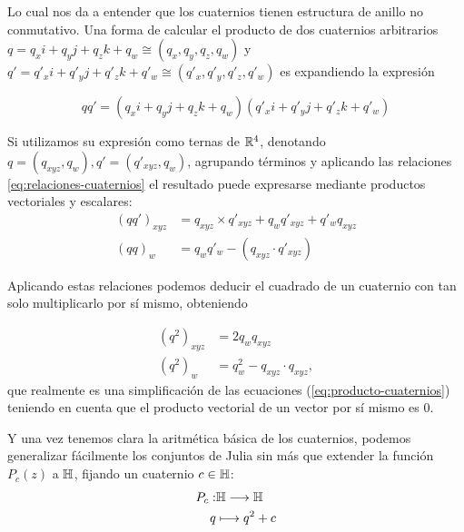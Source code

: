 Lo cual nos da a entender que los cuaternios tienen estructura de anillo no conmutativo. Una forma de calcular el producto de dos cuaternios arbitrarios $q = q_x i + q_y j + q_z k + q_w\cong (q_x,q_y,q_z,q_w)$ y $q' = q'_x i + q'_y j + q'_z  k + q'_w\cong (q'_x,q'_y,q'_z,q'_w)$ es expandiendo la expresión

\begin{equation}
    qq' = (q_x i + q_y j + q_z k + q_w)(q'_x i + q'_y j + q'_z k + q'_w) 
\end{equation}

Si utilizamos su expresión como ternas de $\mathbb{R}^4$, denotando $q=(q_{xyz},q_w), q'=(q'_{xyz},q_w)$, agrupando términos y aplicando las relaciones \ref{eq:relaciones-cuaternios} el resultado puede expresarse mediante productos vectoriales y escalares:
\begin{equation}
    \label{eq:producto-cuaternios}
    \begin{split}
        (qq')_{xyz} &= q_{xyz}\times q'_{xyz} + q_w q'_{xyz} + q'_wq_{xyz} \\
        (qq)_w &= q_wq'_w - (q_{xyz}\cdot q'_{xyz})
    \end{split}
\end{equation}

Aplicando estas relaciones podemos deducir el cuadrado de un cuaternio con tan solo multiplicarlo por sí mismo, obteniendo

\begin{equation}
    \label{eq:cuadrado-cuaternio}
    \begin{split}
        (q^2)_{xyz} &= 2q_w q_{xyz} \\
        (q^2)_w &= q_w^2 - q_{xyz}\cdot q_{xyz},
    \end{split}
\end{equation}
que realmente es una simplificación de las ecuaciones (\ref{eq:producto-cuaternios}) teniendo en cuenta que el producto vectorial de un vector por sí mismo es $0$.

Y una vez tenemos clara la aritmética básica de los cuaternios, podemos generalizar fácilmente los conjuntos de Julia sin más que extender la función $P_c(z)$ a $\mathbb{H}$, fijando un cuaternio $c\in\mathbb{H}$:
\begin{equation}
    \label{eq:f-julia-cuaternios}
    \begin{split}
        P_c :& \mathbb{H} \longrightarrow \mathbb{H} \\
        q & \longmapsto q^2 + c
    \end{split}
\end{equation}

